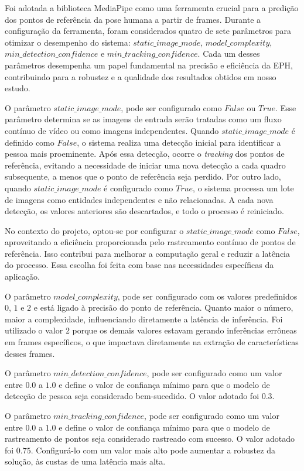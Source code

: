 Foi adotada a biblioteca MediaPipe como uma ferramenta crucial para a predição dos pontos de referência da pose humana a partir de frames. Durante a configuração da ferramenta, foram considerados quatro de sete parâmetros para otimizar o desempenho do sistema: $static\_image\_mode$, $model\_complexity$, $min\_detection\_confidence$ e $min\_tracking\_confidence$. Cada um desses parâmetros desempenha um papel fundamental na precisão e eficiência da \ac{EPH}, contribuindo para a robustez e a qualidade dos resultados obtidos em nosso estudo.

O parâmetro $static\_image\_mode$, pode ser configurado como $False$ ou $True$. Esse parâmetro determina se as imagens de entrada serão tratadas como um fluxo contínuo de vídeo ou como imagens independentes. Quando $static\_image\_mode$ é definido como $False$, o sistema realiza uma detecção inicial para identificar a pessoa mais proeminente. Após essa detecção, ocorre o \textit{tracking} dos pontos de referência, evitando a necessidade de iniciar uma nova detecção a cada quadro subsequente, a menos que o ponto de referência seja perdido. Por outro lado, quando $static\_image\_mode$ é configurado como $True$, o sistema processa um lote de imagens como entidades independentes e não relacionadas. A cada nova detecção, os valores anteriores são descartados, e todo o processo é reiniciado.

No contexto do projeto, optou-se por configurar o $static\_image\_mode$ como $False$, aproveitando a eficiência proporcionada pelo rastreamento contínuo de pontos de referência. Isso contribui para melhorar a computação geral e reduzir a latência do processo. Essa escolha foi feita com base nas necessidades específicas da aplicação.

O parâmetro $model\_complexity$, pode ser configurado com os valores predefinidos $0$, $1$ e $2$ e está ligado à precisão do ponto de referência. Quanto maior o número, maior a complexidade, influenciando diretamente a latência de inferência. Foi utilizado o valor $2$ porque os demais valores estavam gerando inferências errôneas em frames específicos, o que impactava diretamente na extração de características desses frames.

O parâmetro $min\_detection\_confidence$, pode ser configurado como um valor entre $0.0$ a $1.0$ e define o valor de confiança mínimo para que o modelo de detecção de pessoa seja considerado bem-sucedido. O valor adotado foi $0.3$.

O parâmetro $min\_tracking\_confidence$, pode ser configurado como um valor entre $0.0$ a $1.0$ e define o valor de confiança mínimo para que o modelo de rastreamento de pontos seja considerado rastreado com sucesso. O valor adotado foi $0.75$. Configurá-lo com um valor mais alto pode aumentar a robustez da solução, às custas de uma latência mais alta.

